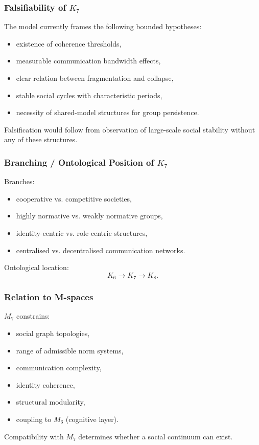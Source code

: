 \subsubsection{Falsifiability of \texorpdfstring{$K_7$}{K_7}}

The model currently frames the following bounded hypotheses: \begin{itemize}
    \item existence of coherence thresholds,
    \item measurable communication bandwidth effects,
    \item clear relation between fragmentation and collapse,
    \item stable social cycles with characteristic periods,
    \item necessity of shared-model structures for group persistence.
\end{itemize}

Falsification would follow from observation of large-scale social stability
without any of these structures.

\subsubsection{Branching / Ontological Position of \texorpdfstring{$K_7$}{K_7}}

Branches:
\begin{itemize}
    \item cooperative vs. competitive societies,
    \item highly normative vs. weakly normative groups,
    \item identity-centric vs. role-centric structures,
    \item centralised vs. decentralised communication networks.
\end{itemize}

Ontological location:
\[
K_6 \to K_7 \to K_8.
\]

\subsubsection{Relation to M-spaces}

$M_7$ constrains:
\begin{itemize}
    \item social graph topologies,
    \item range of admissible norm systems,
    \item communication complexity,
    \item identity coherence,
    \item structural modularity,
    \item coupling to $M_6$ (cognitive layer).
\end{itemize}

Compatibility with $M_7$ determines whether a social continuum can exist.
